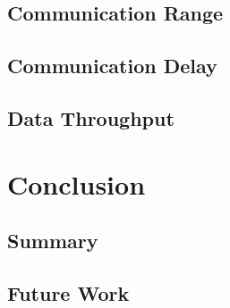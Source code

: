 \section{Communication Range}
\section{Communication Delay}
\section{Data Throughput}


\chapter{Conclusion}
\section{Summary}
\section{Future Work}
